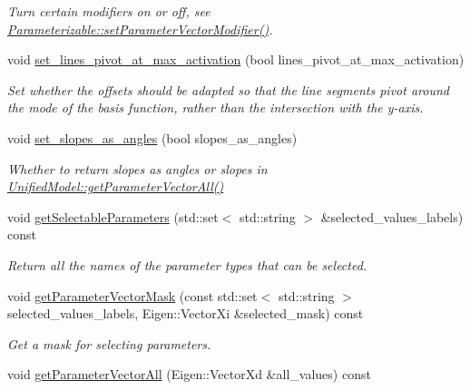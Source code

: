 \begin{DoxyCompactItemize}
\begin{DoxyCompactList}\small\item\em Turn certain modifiers on or off, see \hyperlink{classDmpBbo_1_1Parameterizable_a6eefba9dfdcfe8878c10150074c6a68e}{Parameterizable\+::set\+Parameter\+Vector\+Modifier()}. \end{DoxyCompactList}\item 
void \hyperlink{classDmpBbo_1_1UnifiedModel_aea1a05d703891f1bab48039a23cb78b4}{set\+\_\+lines\+\_\+pivot\+\_\+at\+\_\+max\+\_\+activation} (bool lines\+\_\+pivot\+\_\+at\+\_\+max\+\_\+activation)
\begin{DoxyCompactList}\small\item\em Set whether the offsets should be adapted so that the line segments pivot around the mode of the basis function, rather than the intersection with the y-\/axis. \end{DoxyCompactList}\item 
void \hyperlink{classDmpBbo_1_1UnifiedModel_a812ed8332b71789b6d8fd9355ff94fa7}{set\+\_\+slopes\+\_\+as\+\_\+angles} (bool slopes\+\_\+as\+\_\+angles)
\begin{DoxyCompactList}\small\item\em Whether to return slopes as angles or slopes in \hyperlink{classDmpBbo_1_1UnifiedModel_a29429ff2771d1e56cfba7250d38da4b1}{Unified\+Model\+::get\+Parameter\+Vector\+All()} \end{DoxyCompactList}\item 
void \hyperlink{classDmpBbo_1_1UnifiedModel_a887f4747734bd8b7cc4f799092ff31b4}{get\+Selectable\+Parameters} (std\+::set$<$ std\+::string $>$ \&selected\+\_\+values\+\_\+labels) const 
\begin{DoxyCompactList}\small\item\em Return all the names of the parameter types that can be selected. \end{DoxyCompactList}\item 
void \hyperlink{classDmpBbo_1_1UnifiedModel_a9dba1f93e426e7511630ec1ece4ace17}{get\+Parameter\+Vector\+Mask} (const std\+::set$<$ std\+::string $>$ selected\+\_\+values\+\_\+labels, Eigen\+::\+Vector\+Xi \&selected\+\_\+mask) const 
\begin{DoxyCompactList}\small\item\em Get a mask for selecting parameters. \end{DoxyCompactList}\item 
void \hyperlink{classDmpBbo_1_1UnifiedModel_a29429ff2771d1e56cfba7250d38da4b1}{get\+Parameter\+Vector\+All} (Eigen\+::\+Vector\+Xd \&all\+\_\+values) const 

\end{DoxyCompactItemize}

